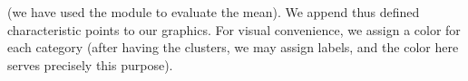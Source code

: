 \documentclass[a4paper,12pt,polish]{jupyterBook}
\begin{document}
\sphinxAtStartPar
(we have used the  module to evaluate the mean). We append thus defined characteristic points to our graphics. For visual convenience, we assign a color for each category (after having the clusters, we may assign labels, and the color here serves precisely this purpose).
\begin{sphinxVerbatimInput}

\begin{sphinxVerbatim}[commandchars=\\\{\}]
\PYG{p}{[}\PYG{p}{]}
\end{sphinxVerbatim}
\end{sphinxVerbatimInput}
\end{document}
